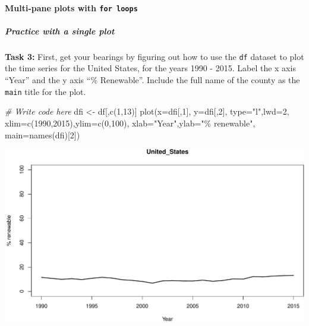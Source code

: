 \documentclass[
]{book}
\newenvironment{Shaded}{\begin{snugshade}}{\end{snugshade}}
\newcommand{\AttributeTok}[1]{\textcolor[rgb]{0.77,0.63,0.00}{#1}}
\newcommand{\CommentTok}[1]{\textcolor[rgb]{0.56,0.35,0.01}{\textit{#1}}}
\newcommand{\DecValTok}[1]{\textcolor[rgb]{0.00,0.00,0.81}{#1}}
\newcommand{\FunctionTok}[1]{\textcolor[rgb]{0.00,0.00,0.00}{#1}}
\newcommand{\NormalTok}[1]{#1}
\newcommand{\OtherTok}[1]{\textcolor[rgb]{0.56,0.35,0.01}{#1}}
\newcommand{\StringTok}[1]{\textcolor[rgb]{0.31,0.60,0.02}{#1}}
\begin{document}
\hypertarget{multi-pane-plots-with-for-loops}{%
\paragraph*{\texorpdfstring{Multi-pane plots with \texttt{for\ loops}}{Multi-pane plots with for loops}}\label{multi-pane-plots-with-for-loops}}

\hypertarget{practice-with-a-single-plot}{%
\subparagraph*{Practice with a single plot}\label{practice-with-a-single-plot}}

\textbf{Task 3:} First, get your bearings by figuring out how to use the \texttt{df} dataset to plot the time series for the United States, for the years 1990 - 2015. Label the x axis ``Year'' and the y axis ``\% Renewable''. Include the full name of the county as the \texttt{main} title for the plot.

\begin{Shaded}
\begin{Highlighting}[]
\CommentTok{\# Write code here}
\NormalTok{dfi }\OtherTok{\textless{}{-}}\NormalTok{ df[,}\FunctionTok{c}\NormalTok{(}\DecValTok{1}\NormalTok{,}\DecValTok{13}\NormalTok{)] }
\FunctionTok{plot}\NormalTok{(}\AttributeTok{x=}\NormalTok{dfi[,}\DecValTok{1}\NormalTok{],}
     \AttributeTok{y=}\NormalTok{dfi[,}\DecValTok{2}\NormalTok{],}
     \AttributeTok{type=}\StringTok{"l"}\NormalTok{,}\AttributeTok{lwd=}\DecValTok{2}\NormalTok{,}
     \AttributeTok{xlim=}\FunctionTok{c}\NormalTok{(}\DecValTok{1990}\NormalTok{,}\DecValTok{2015}\NormalTok{),}\AttributeTok{ylim=}\FunctionTok{c}\NormalTok{(}\DecValTok{0}\NormalTok{,}\DecValTok{100}\NormalTok{),}
     \AttributeTok{xlab=}\StringTok{"Year"}\NormalTok{,}\AttributeTok{ylab=}\StringTok{"\% renewable"}\NormalTok{,}
     \AttributeTok{main=}\FunctionTok{names}\NormalTok{(dfi)[}\DecValTok{2}\NormalTok{])}
\end{Highlighting}
\end{Shaded}

\includegraphics{figures/unnamed-chunk-327-1.pdf}
\end{document}
